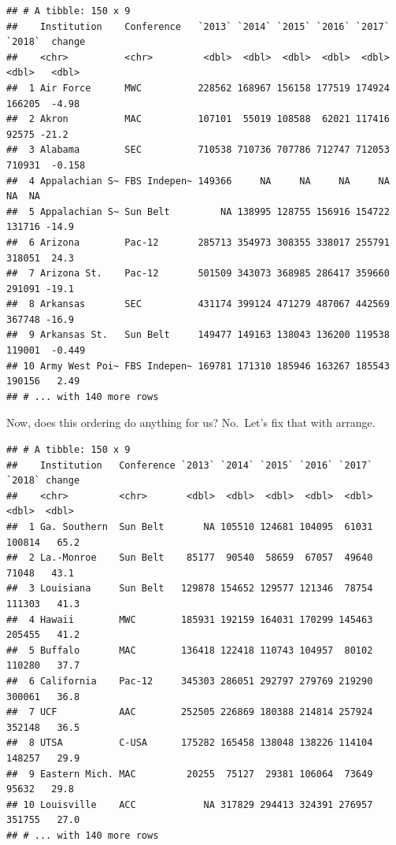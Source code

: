 \documentclass[
]{book}
\newenvironment{Shaded}{\begin{snugshade}}{\end{snugshade}}
\newcommand{\DataTypeTok}[1]{\textcolor[rgb]{0.13,0.29,0.53}{#1}}
\newcommand{\DecValTok}[1]{\textcolor[rgb]{0.00,0.00,0.81}{#1}}
\newcommand{\KeywordTok}[1]{\textcolor[rgb]{0.13,0.29,0.53}{\textbf{#1}}}
\newcommand{\NormalTok}[1]{#1}
\newcommand{\OperatorTok}[1]{\textcolor[rgb]{0.81,0.36,0.00}{\textbf{#1}}}
\newcommand{\StringTok}[1]{\textcolor[rgb]{0.31,0.60,0.02}{#1}}
\begin{document}
\begin{verbatim}
## # A tibble: 150 x 9
##    Institution    Conference   `2013` `2014` `2015` `2016` `2017` `2018`  change
##    <chr>          <chr>         <dbl>  <dbl>  <dbl>  <dbl>  <dbl>  <dbl>   <dbl>
##  1 Air Force      MWC          228562 168967 156158 177519 174924 166205  -4.98 
##  2 Akron          MAC          107101  55019 108588  62021 117416  92575 -21.2  
##  3 Alabama        SEC          710538 710736 707786 712747 712053 710931  -0.158
##  4 Appalachian S~ FBS Indepen~ 149366     NA     NA     NA     NA     NA  NA    
##  5 Appalachian S~ Sun Belt         NA 138995 128755 156916 154722 131716 -14.9  
##  6 Arizona        Pac-12       285713 354973 308355 338017 255791 318051  24.3  
##  7 Arizona St.    Pac-12       501509 343073 368985 286417 359660 291091 -19.1  
##  8 Arkansas       SEC          431174 399124 471279 487067 442569 367748 -16.9  
##  9 Arkansas St.   Sun Belt     149477 149163 138043 136200 119538 119001  -0.449
## 10 Army West Poi~ FBS Indepen~ 169781 171310 185946 163267 185543 190156   2.49 
## # ... with 140 more rows
\end{verbatim}

Now, does this ordering do anything for us? No.~Let's fix that with arrange.

\begin{Shaded}
\end{Shaded}

\begin{verbatim}
## # A tibble: 150 x 9
##    Institution   Conference `2013` `2014` `2015` `2016` `2017` `2018` change
##    <chr>         <chr>       <dbl>  <dbl>  <dbl>  <dbl>  <dbl>  <dbl>  <dbl>
##  1 Ga. Southern  Sun Belt       NA 105510 124681 104095  61031 100814   65.2
##  2 La.-Monroe    Sun Belt    85177  90540  58659  67057  49640  71048   43.1
##  3 Louisiana     Sun Belt   129878 154652 129577 121346  78754 111303   41.3
##  4 Hawaii        MWC        185931 192159 164031 170299 145463 205455   41.2
##  5 Buffalo       MAC        136418 122418 110743 104957  80102 110280   37.7
##  6 California    Pac-12     345303 286051 292797 279769 219290 300061   36.8
##  7 UCF           AAC        252505 226869 180388 214814 257924 352148   36.5
##  8 UTSA          C-USA      175282 165458 138048 138226 114104 148257   29.9
##  9 Eastern Mich. MAC         20255  75127  29381 106064  73649  95632   29.8
## 10 Louisville    ACC            NA 317829 294413 324391 276957 351755   27.0
## # ... with 140 more rows
\end{verbatim}
\end{document}
